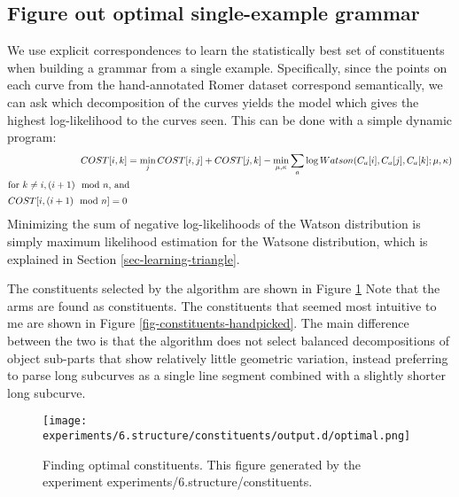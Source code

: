 
\subsection{Figure out optimal single-example grammar}

We use explicit correspondences to learn the statistically best set of
constituents when building a grammar from a single
example. Specifically, since the points on each curve from the
hand-annotated Romer dataset correspond semantically, we can ask which
decomposition of the curves yields the model which gives the highest
log-likelihood to the curves seen. This can be done with a simple
dynamic program:
\begin{align*}
COST[i,k] &= \min_j COST[i,j] + COST[j,k] - \min_{\mu, \kappa} \sum_a \log Watson(C_a[i],C_a[j],C_a[k]; \mu, \kappa)\\
\intertext{for $k\ne i, (i+1) \mod n$, and}
COST[i,(i+1) \mod n] = 0
\end{align*}
Minimizing the sum of negative log-likelihoods of the Watson
distribution is simply maximum likelihood estimation for the Watsone
distribution, which is explained in Section
\ref{sec-learning-triangle}.


The constituents selected by the algorithm are shown in Figure
\ref{fig-constituents-optimal} Note that the arms are found as
constituents. The constituents that seemed most intuitive to me are
shown in Figure \ref{fig-constituents-handpicked}. The main difference
between the two is that the algorithm does not select balanced
decompositions of object sub-parts that show relatively little
geometric variation, instead preferring to parse long subcurves as a
single line segment combined with a slightly shorter long subcurve.

\begin{figure}
\texttt{[image: experiments/6.structure/constituents/output.d/optimal.png]}
\caption[Finding optimal constituents]{Finding optimal constituents. This figure generated by the experiment experiments/6.structure/constituents.}
\label{fig-constituents-optimal}
\end{figure}

